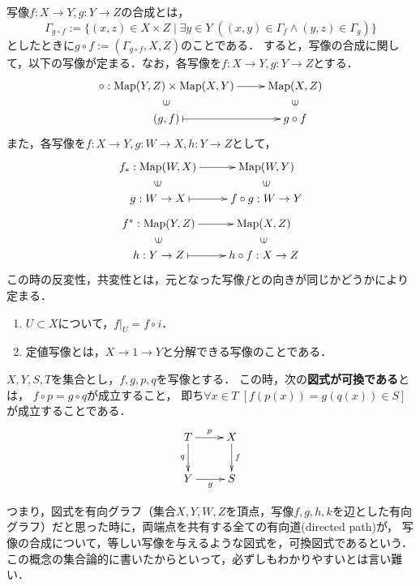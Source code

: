 \documentclass[uplatex, 12pt, dvipdfmx]{jsreport}
\begin{document}
\begin{definition}[composition]
    写像$f:X\to Y,g:Y\to Z$の合成とは，
    \[\Gamma_{g\circ f}:=\{(x,z)\in X\times Z\mid \exists y\in Y\;((x,y)\in\Gamma_f\land(y,z)\in\Gamma_g)\}\]
    としたときに$g\circ f:=(\Gamma_{g\circ f},X,Z)$のことである．
	すると，写像の合成に関して，以下の写像が定まる．なお，各写像を$f:X\to Y, g:Y\to Z$とする．
    \[\xymatrix@R-2pc{
        \circ :\Map(Y,Z)\times\Map(X,Y)\ar[r]&\Map(X,Z)\\
        \rotatebox[origin=c]{90}{$\in$}&\rotatebox[origin=c]{90}{$\in$}\\
        (g,f)\ar@{|->}[r]&g\circ f
    }\]
	また，各写像を$f:X\to Y, g:W\to X, h:Y\to Z$として，
    \[\xymatrix@R-2pc{
        f_*:\Map(W,X)\ar[r]&\Map(W,Y)\\
        \rotatebox[origin=c]{90}{$\in$}&\rotatebox[origin=c]{90}{$\in$}\\
        g:W\to X\ar@{|->}[r]&f\circ g:W\to Y}\]
    \[\xymatrix@R-2pc{f^*:\Map(Y,Z)\ar[r]&\Map(X,Z)\\
        \rotatebox[origin=c]{90}{$\in$}&\rotatebox[origin=c]{90}{$\in$}\\
        h:Y\to Z\ar@{|->}[r]&h\circ f:X\to Z
    }\]
    この時の反変性，共変性とは，元となった写像$f$との向きが同じかどうかにより定まる．
\end{definition}
\begin{remark}\mbox{}
    \begin{enumerate}
        \item $U\subset X$について，$f|_U=f\circ i$．
        \item 定値写像とは，$X\to 1\to Y$と分解できる写像のことである．
    \end{enumerate}
\end{remark}

\begin{definition}[写像の可換図式]
    $X,Y,S,T$を集合とし，$f,g,p,q$を写像とする．
    この時，次の\textbf{図式が可換である}とは，
    $f\circ p=g\circ q$が成立すること，
    即ち$\forall x\in T \; [f(p(x))=g(q(x)) \in S]$が成立することである．
    \[
        \xymatrix{
        T\ar[r]^-p\ar[d]_-q&X\ar[d]^-f\\
        Y\ar[r]_-g&S
        }
    \]
\end{definition}
\begin{remark}
    つまり，図式を有向グラフ（集合$X,Y,W,Z$を頂点，写像$f,g,h,k$を辺とした有向グラフ）だと思った時に，両端点を共有する全ての有向道(directed path)が，
    写像の合成について，等しい写像を与えるような図式を，可換図式であるという．
    この概念の集合論的に書いたからといって，必ずしもわかりやすいとは言い難い．
\end{remark}
\end{document}

